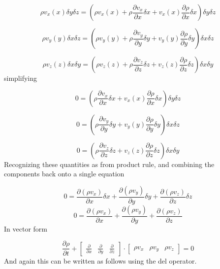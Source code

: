 \begin{equation*}
  \rho{}v_{x}(x)\delta y\delta z=
  \left(\rho{}v_{x}(x)+\rho\frac{\partial{}v_{x}}{\partial{}x}\delta x+v_{x}(x)\frac{\partial\rho}{\partial{}x}\delta x\right)\delta y\delta z
\end{equation*}

\begin{equation*}
  \rho{}v_{y}(y)\delta x\delta z=
  \left(\rho{}v_{y}(y)+\rho\frac{\partial{}v_{y}}{\partial{}y}\delta y+v_{y}(y)\frac{\partial\rho}{\partial{}y}\delta y\right)\delta x\delta z
\end{equation*}

\begin{equation*}
  \rho{}v_{z}(z)\delta x\delta y=
  \left(\rho{}v_{z}(z)+\rho\frac{\partial{}v_{z}}{\partial{}z}\delta z+v_{z}(z)\frac{\partial\rho}{\partial{}z}\delta z\right)\delta x\delta y
\end{equation*}
simplifying

\begin{equation*}
  0=\left(\rho\frac{\partial{}v_{x}}{\partial{}x}\delta x+v_{x}(x)\frac{\partial\rho}{\partial{}x}\delta x\right)\delta y\delta z
\end{equation*}

\begin{equation*}
  0=\left(\rho\frac{\partial{}v_{y}}{\partial{}y}\delta y+v_{y}(y)\frac{\partial\rho}{\partial{}y}\delta y\right)\delta x\delta z
\end{equation*}

\begin{equation*}
  0=\left(\rho\frac{\partial{}v_{z}}{\partial{}z}\delta z+v_{z}(z)\frac{\partial\rho}{\partial{}z}\delta z\right)\delta x\delta y
\end{equation*}
Recognizing these quantities as from product rule, and combining the components back onto a single equation

\begin{equation*}
  0=\frac{\partial(\rho{}v_{x})}{\partial{}x}\delta x+\frac{\partial(\rho{}v_{y})}{\partial{}y}\delta y+\frac{\partial(\rho{}v_{z})}{\partial{}z}\delta z
\end{equation*}
\begin{equation*}
  0=\frac{\partial(\rho{}v_{x})}{\partial{}x}+\frac{\partial(\rho{}v_{y})}{\partial{}y}+\frac{\partial(\rho{}v_{z})}{\partial{}z}
\end{equation*}
In vector form

\begin{equation*}
  \frac{\partial\rho}{\partial{}t}+
  \begin{bmatrix}
    \frac{\partial}{\partial{}x} &
    \frac{\partial}{\partial{}y} &
    \frac{\partial}{\partial{}z}
  \end{bmatrix}
  \cdot
  \begin{bmatrix}
    \rho{}v_{x} &
    \rho{}v_{y} &
    \rho{}v_{z}
  \end{bmatrix}
  =0
\end{equation*}
And again this can be written as follows using the del operator.

